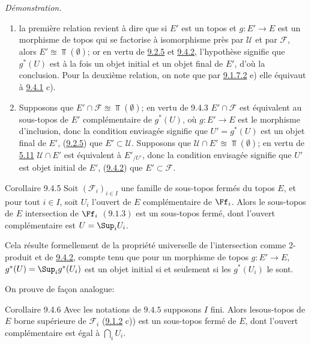 \documentclass[10pt]{../fichiers-configuration-latex/smfart}
\begin{document}
\noindent \emph{Démonstration.}
\begin{enumerate}
\renewcommand{\theenumi}{\alph{enumi}}
\renewcommand{\labelenumi}{\theenumi)}
\item la première relation revient à dire que si $E'$ est un topos et
$g:E'\rightarrow E$ est un morphisme de topos qui se factorise à
isomorphisme près par $\mathcal{U}$ et par $\mathcal{F}$, alors
$E'\approxeq \Top(∅)$; or en vertu de \hyperref[IV.subsubsec9.2.5]{9.2.5} et
\hyperref[IV.prop9.4.2]{9.4.2}, l'hypothèse signifie que $g^{\ast}(U)$ est à la
fois un objet initial et un objet final de $E'$, d'où la conclusion.
Pour la deuxième relation, on note que par \hyperref[IV.exer9.1.7.2]{9.1.7.2} e)
elle équivaut à \hyperref[IV.prop9.4.1]{9.4.1} c).

\item Supposons que $E'\cap \mathcal{F}\approxeq \Top(∅)$; en vertu de
9.4.3 $E'\cap \mathcal{F}$ est équivalent au sous-topos de $E'$
    complémentaire de $g^{\ast}(U)$, où $g:E'\rightarrow E$ est le
    morphisme d'inclusion, donc la condition envisagée signifie que
    $U'=g^{\ast}(U)$ est un objet final de $E'$, \ie (\hyperref[IV.subsubsec9.2.5]{9.2.5}) que
    $E'\subset \mathcal{U}$. Supposons que $\mathcal{U}\cap E'\approxeq
    \Top(∅)$; en vertu de \hyperref[IV.prop5.11]{5.11} $\mathcal{U}\cap E'$ est équivalent à
    $E'_{/U'}$, donc la condition envisagée signifie que $U'$ est
    objet initial de $E'$, \ie (\hyperref[IV.prop9.4.2]{9.4.2}) que $E'\subset \mathcal{F}$.
\end{enumerate}

\begin{enonce*}{Corollaire 9.4.5}
Soit $(\mathcal{F}_i)_{i\in I}$ une famille de sous-topos fermés du
topos $E$, et pour tout $i\in I$, soit $U_i$ l'ouvert de $E$
complémentaire de $\Ff_i$. Alors le sous-topos de $E$ intersection
de $\Ff_i$ $(\hyperref[IV.prop9.1.3]{9.1.3})$ est un sous-topos fermé, dont
l'ouvert complémentaire est $U=\Sup_i U_i$.
\end{enonce*}

Cela résulte formellement de la propriété universelle de
l'intersection comme 2-produit et de \hyperref[IV.prop9.4.2]{9.4.2}, compte tenu
que pour un morphisme de topos $g:E'\rightarrow E$,
$g^{\ast}(U)=\Sup_i g^{\ast}(U_i)$ est un objet initial si et
seulement si les $g^{\ast}(U_i)$ le sont.

On prouve de façon analogue:

\begin{enonce*}{Corollaire 9.4.6}
Avec les notations de  $9.4.5$ supposons $I$ fini. Alors
le\pageoriginale sous-topos de $E$ borne supérieure de $\mathcal{F}_{i}$ {\rm
(\hyperref[IV.rem9.1.2]{9.1.2} c))} est un sous-topos fermé de $E$, dont
l'ouvert complémentaire est égal à $\bigcap_i U_i$.
\end{enonce*}
\end{document}
